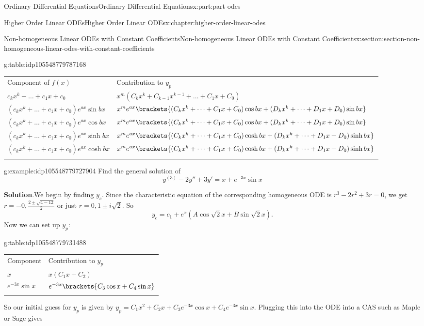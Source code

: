 \documentclass[oneside,10pt,]{book}
\newcommand{\blocktitlefont}{\relax}
\newcommand{\tabularfont}{\relax}
\numberwithin{equation}{part}
\newcommand{\hrulethick} {\noalign{\hrule height 0.11em}}
\begin{document}
\begin{partptx}{Ordinary Differential Equations}{}{Ordinary Differential Equations}{}{}{x:part:part-odes}
\begin{chapterptx}{Higher Order Linear ODEs}{}{Higher Order Linear ODEs}{}{}{x:chapter:higher-order-linear-odes}
\begin{sectionptx}{Non-homogeneous Linear ODEs with Constant Coefficients}{}{Non-homogeneous Linear ODEs with Constant Coefficients}{}{}{x:section:section-non-homogeneous-linear-odes-with-constant-coefficients}
\begin{tableptx}{\textbf{}}{g:table:idp105548779787168}{}
\centering%
{\tabularfont%
\begin{tabular}{ll}\hrulethick
Component of \(f(x)\)&Contribution to \(y_{p}\)\tabularnewline\hrulethick
\(c_{k}x^{k}+\dots+c_{1}x+c_{0}\)&\(x^{m}(C_{k}x^{k}+C_{k-1}x^{k-1}+\dots+C_{1}x+C_{0})\)\tabularnewline[0pt]
\((c_{k}x^{k}+\dots+c_{1}x+c_{0})e^{ax}\sin bx\)&\(x^{m}e^{ax}\brackets{(C_{k}x^{k}+\dots+C_{1}x+C_{0})\cos bx+(D_{k}x^{k}+\dots+D_{1}x+D_{0})\sin bx}\)\tabularnewline[0pt]
\((c_{k}x^{k}+\dots+c_{1}x+c_{0})e^{ax}\cos bx\)&\(x^{m}e^{ax}\brackets{(C_{k}x^{k}+\dots+C_{1}x+C_{0})\cos bx+(D_{k}x^{k}+\dots+D_{1}x+D_{0})\sin bx}\)\tabularnewline[0pt]
\((c_{k}x^{k}+\dots+c_{1}x+c_{0})e^{ax}\sinh bx\)&\(x^{m}e^{ax}\brackets{(C_{k}x^{k}+\dots+C_{1}x+C_{0})\cosh bx+(D_{k}x^{k}+\dots+D_{1}x+D_{0})\sinh bx}\)\tabularnewline[0pt]
\((c_{k}x^{k}+\dots+c_{1}x+c_{0})e^{ax}\cosh bx\)&\(x^{m}e^{ax}\brackets{(C_{k}x^{k}+\dots+C_{1}x+C_{0})\cosh bx+(D_{k}x^{k}+\dots+D_{1}x+D_{0})\sinh bx}\)\tabularnewline\hrulethick
\end{tabular}
}%
\end{tableptx}%
\begin{example}{}{g:example:idp105548779727904}%
Find the general solution of%
\begin{equation*}
y^{(3)}-2y''+3y'= x+e^{-3x}\sin x
\end{equation*}
%
\par\smallskip%
\noindent\textbf{\blocktitlefont Solution}.\hypertarget{g:solution:idp105548779728800}{}\quad{}We begin by finding \(y_{c}\). Since the characteristic equation of the corresponding homogeneous ODE is \(r^{3}-2r^{2}+3r=0\), we get \(r=-0,\frac{2\pm\sqrt{4-12}}{2}\) or just \(r=0,1\pm i\sqrt{2}\). So%
\begin{equation*}
y_{c} = c_{1}+e^{x}(A\cos\sqrt{2}x+B\sin\sqrt{2}x).
\end{equation*}
Now we can set up \(y_{p}\):%
\begin{tableptx}{\textbf{}}{g:table:idp105548779731488}{}%
\centering%
{\tabularfont%
\begin{tabular}{ll}\hrulethick
Component&Contribution to \(y_{p}\)\tabularnewline\hrulethick
\(x\)&\(x(C_{1}x+C_{2})\)\tabularnewline[0pt]
\(e^{-3x}\sin x\)&\(e^{-3x}\brackets{C_{3}\cos x+C_{4}\sin x}\)\tabularnewline\hrulethick
\end{tabular}
}%
\end{tableptx}%
So our initial guess for \(y_{p}\) is given by \(y_{p} = C_{1}x^{2}+C_{2}x+C_{3}e^{-3x}\cos x+C_{4}e^{-3x}\sin x\). Plugging this into the ODE into a CAS such as Maple or Sage gives%

\end{example}
\end{sectionptx}
\end{chapterptx}
\end{partptx}
\end{document}
